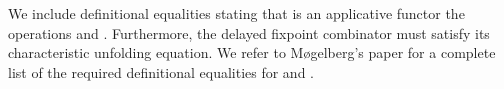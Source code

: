 \begin{AgdaAlign}
We include definitional equalities stating that  is an applicative functor \wrt the operations  and .
Furthermore, the delayed fixpoint combinator  must satisfy its characteristic unfolding equation.
We refer to M{\o}gelberg's paper \cite{Mogelberg14} for a complete list of the required definitional equalities for  and .
\end{AgdaAlign}
